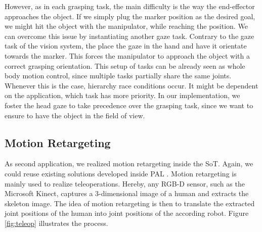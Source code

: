 However, as in each grasping task, the main difficulty is the way the end-effector approaches the object. If we simply plug the marker position as the desired goal, we might hit the object with the manipulator, while reaching the position. We can overcome this issue by instantiating another gaze task. Contrary to the gaze task of the vision system, the place the gaze in the hand and have it orientate towards the marker. This forces the manipulator to approach the object with a correct grasping orientation.
\newpage
This setup of tasks can be already seen as whole body motion control, since multiple tasks partially share the same joints. Whenever this is the case, hierarchy race conditions occur. It might be dependent on the application, which task has more priority. In our implementation, we foster the head gaze to take precedence over the grasping task, since we want to ensure to have the object in the field of view.

\subsection*{Motion Retargeting}
As second application, we realized motion retargeting inside the SoT. Again, we could reuse existing solutions developed inside PAL \cite{marcus}. Motion retargeting is mainly used to realize teleoperations. Hereby, any RGB-D sensor, such as the Microsoft Kinect, captures a 3-dimensional image of a human and extracts the skeleton image. The idea of motion retargeting is then to translate the extracted joint positions of the human into joint positions of the according robot. Figure \ref{fig:teleop} illustrates the process.


